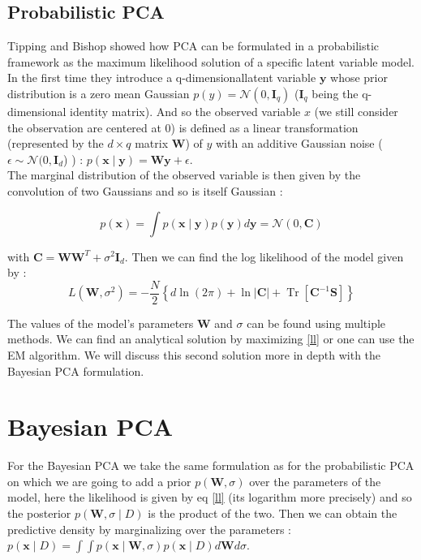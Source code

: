 \documentclass{article}
\begin{document}
\subsection{Probabilistic PCA}

Tipping and Bishop \cite{tipping1999ppca} showed how PCA can be formulated in a probabilistic framework as the maximum likelihood solution of a specific latent variable model.\\
In the first time they introduce a q-dimensionallatent variable $\mathbf{y}$ whose prior distribution is a zero mean Gaussian $p(y) = \mathcal{N}(0,\mathbf{I}_q) $ ($\mathbf{I}_q$ being the q-dimensional identity matrix). And so the observed variable $x$ (we still consider the observation are centered at 0) is defined as a linear transformation (represented by the $d \times q$ matrix $\mathbf{W}$) of $y$ with an additive Gaussian noise ($\epsilon \sim \mathcal{N}(0,\mathbf{I}_d$) )  : $p(\mathbf{x} \mid \mathbf{y}) = \mathbf{W} \mathbf{y} + \epsilon$.\\
The marginal distribution of the observed variable is then given by the convolution of two Gaussians and so is itself Gaussian :

$$p(\mathbf{x})=\int p(\mathbf{x} \mid \mathbf{y}) p(\mathbf{y}) d \mathbf{y}=\mathcal{N}(0, \mathbf{C})$$

with $\mathbf{C} = \mathbf{W} \mathbf{W}^T + \sigma^2 \mathbf{I}_d $. Then we can find the log likelihood of the model given by  :
\begin{equation}
    L\left(\mathbf{W}, \sigma^{2}\right)=-\frac{N}{2}\left\{d \ln (2 \pi)+\ln |\mathbf{C}|+\operatorname{Tr}\left[\mathbf{C}^{-1} \mathbf{S}\right]\right\}
    \label{ll}
\end{equation}

The values of the model's parameters $\mathbf{W}$ and $\sigma$ can be found using multiple methods. We can find an analytical solution by maximizing \ref{ll} or one can use the EM algorithm. We will discuss this second solution more in depth with the Bayesian PCA formulation.

\section{Bayesian PCA}

For the Bayesian PCA we take the same formulation as for the probabilistic PCA on which we are going to add a prior $p(\mathbf{W},\sigma)$ over the parameters of the model, here the likelihood is given by eq \ref{ll} (its logarithm more precisely) and so the posterior $p(\mathbf{W},\sigma\mid D)$ is the product of the two. Then we can obtain the predictive density by marginalizing over the parameters : $p(\mathbf{x} \mid D) = \int \int p(\mathbf{x} \mid \mathbf{W},\sigma) p(\mathbf{x} \mid D) d\mathbf{W} d \sigma$.\\
\end{document}
